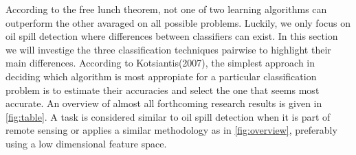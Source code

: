  

According to the free lunch theorem, not one of two learning algorithms can outperform the other avaraged on all possible problems. Luckily, we only focus on oil spill detection where differences between classifiers can exist. In this section we will investige the three classification techniques pairwise to highlight their main differences. According to Kotsiantis(2007), the simplest approach in deciding which algorithm is most appropiate for a particular classification problem is to estimate their accuracies and select the one that seems most accurate\cite{kotsiantis2007supervised}. An overview of almost all forthcoming research results is given in \ref{fig:table}. A task is considered similar to oil spill detection when it is part of remote sensing or applies a similar methodology as in \ref{fig:overview}, preferably using a low dimensional feature space.